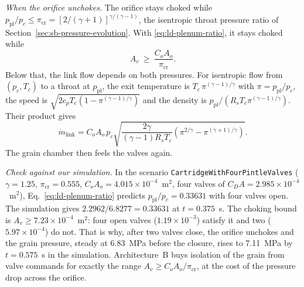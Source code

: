 \emph{When the orifice unchokes.} The orifice stays choked while
$p_{\mathrm{pl}}/p_c\le\pi_{\mathrm{cr}}
=[2/(\gamma+1)]^{\gamma/(\gamma-1)}$, the isentropic throat pressure
ratio of Section~\ref{sec:sb-pressure-evolution}. With
\eqref{eq:ld-plenum-ratio}, it stays choked while
\[
 A_v\ \ge\ \frac{C_oA_o}{\pi_{\mathrm{cr}}}.
\]
Below that, the link flow depends on both pressures. For isentropic
flow from $(p_c,T_c)$ to a throat at $p_{\mathrm{pl}}$, the exit
temperature is $T_c\,\pi^{(\gamma-1)/\gamma}$ with
$\pi=p_{\mathrm{pl}}/p_c$, the speed is
$\sqrt{2c_pT_c(1-\pi^{(\gamma-1)/\gamma})}$ and the density is
$p_{\mathrm{pl}}/(R_sT_c\pi^{(\gamma-1)/\gamma})$. Their product gives
\[
 \dot m_{\mathrm{link}}
 =C_oA_o\,p_c\sqrt{\frac{2\gamma}{(\gamma-1)R_sT_c}
   \left(\pi^{2/\gamma}-\pi^{(\gamma+1)/\gamma}\right)} .
\]
The grain chamber then feels the valves again.

\emph{Check against our simulation.} In the scenario
\texttt{CartridgeWithFourPintleValves} ($\gamma=1.25$,
$\pi_{\mathrm{cr}}=0.555$, $C_oA_o=4.015\times10^{-4}$~m$^2$, four
valves of $C_{D}A=2.985\times10^{-4}$~m$^2$), Eq.~\eqref{eq:ld-plenum-ratio}
predicts $p_{\mathrm{pl}}/p_c=0.33631$ with four valves open. The
simulation gives $2.2962/6.8277=0.33631$ at $t=0.375$~s. The choking
bound is $A_v\ge7.23\times10^{-4}$~m$^2$: four open valves
($1.19\times10^{-3}$) satisfy it and two ($5.97\times10^{-4}$) do not.
That is why, after two valves close, the orifice unchokes and the
grain pressure, steady at 6.83~MPa before the closure, rises to
7.11~MPa by $t=0.575$~s in the simulation. Architecture~B
buys isolation of the grain from valve commands for exactly the range
$A_v\ge C_oA_o/\pi_{\mathrm{cr}}$, at the cost of the pressure drop
across the orifice.

